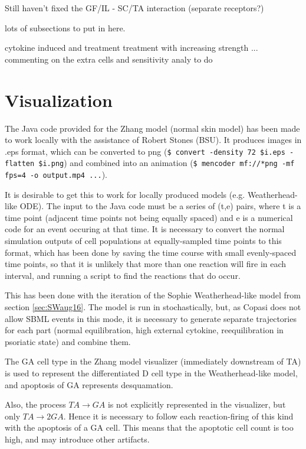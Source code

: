 \documentclass[a4paper,10pt]{report}
\begin{document}
Still haven't fixed the GF/IL - SC/TA interaction (separate receptors?)

lots of subsections to put  in here. 

cytokine induced and treatment 
treatment with increasing strength
 ... commenting on the extra cells and 
sensitivity analy to do 


\section{Visualization}\label{sec:SWvisu}

The Java code provided for the Zhang model (normal skin model) has been made to work locally with the assistance of Robert Stones (BSU). It produces images in .eps format, which can be converted to png ({\tt \$ convert -density 72  \$i.eps -flatten \$i.png}) and combined into an animation ({\tt \$ mencoder mf://*png -mf fps=4 -o output.mp4 ...}).

It is desirable to get this to work for locally produced models (e.g. Weatherhead-like ODE). 
The input to the Java code must be a series of (t,e) pairs, where t is a time point (adjacent time points not being equally spaced) and e is a numerical code for an event occuring at that time. It is necessary to convert the normal simulation outputs of cell populations at equally-sampled time points to this format, which
has been done by saving the time course with small evenly-spaced time points, so that it is unlikely that more than one reaction will fire in each interval, and running a script to find the reactions that do occur. 

This has been done with the iteration of the Sophie Weatherhead-like model from 
section \ref{sec:SWaug16}. The model is run in stochastically, but, as Copasi does not allow SBML events in this mode, it is necessary to generate separate trajectories for each part (normal equilibration, high external cytokine, reequilibration in psoriatic state) and combine them. 


The GA cell type in the Zhang model visualizer (immediately downstream of TA) is used to represent the differentiated D cell type in the Weatherhead-like model, and apoptosis of GA represents desquamation.

Also, the process $TA \rightarrow GA$ is not explicitly represented in the visualizer,  but only $TA \rightarrow 2 GA$. Hence it is necessary to follow each reaction-firing of this kind with the apoptosis of a GA cell. This means that the apoptotic cell count is too high, and may introduce other artifacts. 
\end{document}
